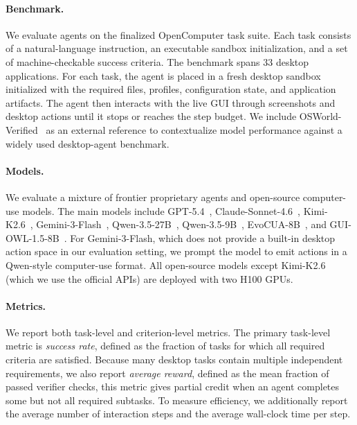 \documentclass{llmxive}
\begin{document}
\paragraph{Benchmark.}
We evaluate agents on the finalized OpenComputer task suite. Each task consists of a natural-language
instruction, an executable sandbox initialization, and a set of machine-checkable success criteria.
The benchmark spans 33 desktop applications. For each task, the agent is placed in a fresh desktop sandbox initialized with the required files, profiles, configuration state, and application artifacts. The agent then interacts with the live GUI
through screenshots and desktop actions until it stops or reaches the step budget. We include OSWorld-Verified~\citep{xie2024osworld} as an external reference to contextualize model performance against a widely used desktop-agent benchmark.

\paragraph{Models.}
We evaluate a mixture of frontier proprietary agents and open-source computer-use models. The
main models include GPT-5.4~\citep{openai2026gpt54}, Claude-Sonnet-4.6~\citep{anthropic2026sonnet46}, Kimi-K2.6~\citep{moonshot2026kimi26}, Gemini-3-Flash~\citep{google2025gemini3flash}, Qwen-3.5-27B~\citep{qwen2026qwen35},
Qwen-3.5-9B~\citep{qwen2026qwen35}, EvoCUA-8B~\citep{xue2026evocua}, and GUI-OWL-1.5-8B~\citep{xu2026mobile}. For Gemini-3-Flash, which does not
provide a built-in desktop action space in our evaluation setting, we prompt the model to emit actions in a Qwen-style computer-use format. All open-source models except Kimi-K2.6 (which we use the official APIs) are deployed with two H100 GPUs.

\paragraph{Metrics.}
We report both task-level and criterion-level metrics. The primary task-level metric is \emph{success
rate}, defined as the fraction of tasks for which all required criteria are satisfied. Because many desktop
tasks contain multiple independent requirements, we also report \emph{average reward}, defined as
the mean fraction of passed verifier checks, this metric gives partial credit when an agent completes some but not all required subtasks. To measure
efficiency, we additionally report the average number of interaction steps and the average wall-clock
time per step.
\end{document}
